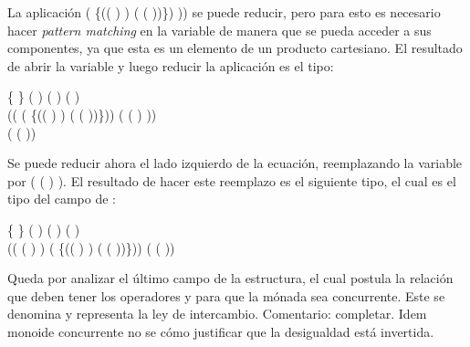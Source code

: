 La aplicación (\AgdaSymbol{$\lambda$} \{(( \AgdaInductiveConstructor{,} ) \AgdaInductiveConstructor{,} ) \AgdaSymbol{$\rightarrow$} ( \AgdaInductiveConstructor{,} ( \AgdaInductiveConstructor{,} ))\}) )) se puede reducir, pero para esto es necesario hacer \textit{pattern matching} en la variable  de manera que se pueda acceder a sus componentes, ya que esta es un elemento de un producto cartesiano. El resultado de abrir la variable  y luego reducir la aplicación es el tipo:
\begin{center}
\AgdaSymbol{$\forall$} \{ \AgdaSymbol{:} \} \AgdaSymbol{$\rightarrow$} ( \AgdaSymbol{:} ) ( \AgdaSymbol{:} ) ( \AgdaSymbol{:} ) \AgdaSymbol{$\rightarrow$} \\ ((\AgdaSymbol{$\lambda$}  \AgdaSymbol{$\rightarrow$}  \AgdaField{$\gg=$} (\AgdaSymbol{$\lambda$} \{(( \AgdaInductiveConstructor{,} ) \AgdaInductiveConstructor{,} ) \AgdaSymbol{$\rightarrow$}  ( \AgdaInductiveConstructor{,} ( \AgdaInductiveConstructor{,} ))\})) ( ( ) )) \\  (  ( ))
\end{center}

Se puede reducir ahora el lado izquierdo de la ecuación, reemplazando la variable  por ( ( ) ). El resultado de hacer este reemplazo es el siguiente tipo, el cual es el tipo del campo  de :
\begin{center}
\AgdaSymbol{$\forall$} \{ \AgdaSymbol{:} \} \AgdaSymbol{$\rightarrow$} ( \AgdaSymbol{:} ) ( \AgdaSymbol{:} ) ( \AgdaSymbol{:} ) \AgdaSymbol{$\rightarrow$} \\ (( ( ) ) \AgdaField{$\gg=$} (\AgdaSymbol{$\lambda$} \{(( \AgdaInductiveConstructor{,} ) \AgdaInductiveConstructor{,} ) \AgdaSymbol{$\rightarrow$}  ( \AgdaInductiveConstructor{,} ( \AgdaInductiveConstructor{,} ))\}))  (  ( ))
\end{center}

Queda por analizar el último campo de la estructura, el cual postula la relación que deben tener los operadores \AgdaField{$\gg=$} y  para que la mónada sea concurrente. Este se denomina  y representa la ley de intercambio. {\color{red} Comentario: completar. Idem monoide concurrente no se cómo justificar que la desigualdad está invertida.}

